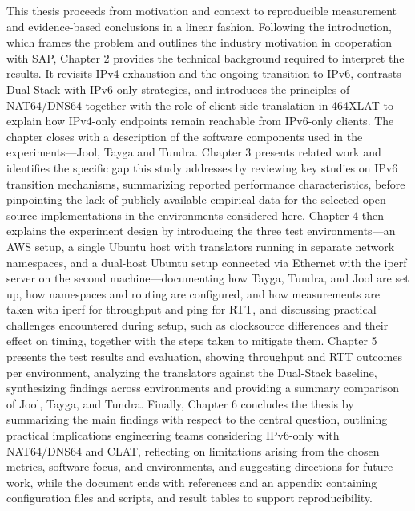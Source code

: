 This thesis proceeds from motivation and context to reproducible measurement and evidence-based conclusions in a linear fashion. Following the introduction, which frames the problem and outlines the industry motivation in cooperation with SAP, Chapter 2 provides the technical background required to interpret the results. It revisits IPv4 exhaustion and the ongoing transition to IPv6, contrasts Dual-Stack with IPv6-only strategies, and introduces the principles of NAT64/DNS64 together with the role of client-side translation in 464XLAT to explain how IPv4-only endpoints remain reachable from IPv6-only clients. The chapter closes with a description of the software components used in the experiments—Jool, Tayga and Tundra. Chapter 3 presents related work and identifies the specific gap this study addresses by reviewing key studies on IPv6 transition mechanisms, summarizing reported performance characteristics, before pinpointing the lack of publicly available empirical data for the selected open-source implementations in the environments considered here. Chapter 4 then explains the experiment design by introducing the three test environments—an AWS setup, a single Ubuntu host with translators running in separate network namespaces, and a dual-host Ubuntu setup connected via Ethernet with the iperf server on the second machine—documenting how Tayga, Tundra, and Jool are set up, how namespaces and routing are configured, and how measurements are taken with iperf for throughput and ping for RTT, and discussing practical challenges encountered during setup, such as clocksource differences and their effect on timing, together with the steps taken to mitigate them. Chapter 5 presents the test results and evaluation, showing throughput and RTT outcomes per environment, analyzing the translators against the Dual-Stack baseline, synthesizing findings across environments and providing a summary comparison of Jool, Tayga, and Tundra. Finally, Chapter 6 concludes the thesis by summarizing the main findings with respect to the central question, outlining practical implications engineering teams considering IPv6-only with NAT64/DNS64 and CLAT, reflecting on limitations arising from the chosen metrics, software focus, and environments, and suggesting directions for future work, while the document ends with references and an appendix containing configuration files and scripts, and result tables to support reproducibility.
